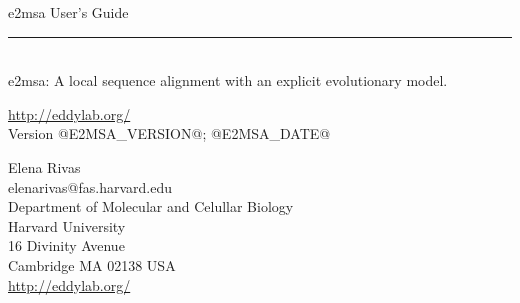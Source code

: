 \begin{titlepage}
{\Large

\vspace*{\fill}

\noindent
{\Huge {e2msa User's Guide}} \vspace{-8.0pt} \\ 
\rule[2pt]{\textwidth}{1pt} \\
\hspace*{\fill} {\large {e2msa: A local sequence alignment with an explicit evolutionary model.} \\ }

\vspace*{\fill}

\begin{center}
\url{http://eddylab.org/}\\
Version @E2MSA_VERSION@; @E2MSA_DATE@ \\ 

\vspace*{\fill}

Elena Rivas\\
elenarivas@fas.harvard.edu\\
Department of Molecular and Celullar Biology\\
Harvard University\\
16 Divinity Avenue\\
Cambridge MA 02138 USA\\
\url{http://eddylab.org/} \\
\end{center}

\vspace*{\fill}

}
\end{titlepage}
